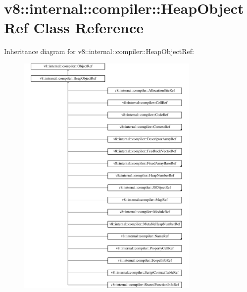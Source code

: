 \hypertarget{classv8_1_1internal_1_1compiler_1_1HeapObjectRef}{}\section{v8\+:\+:internal\+:\+:compiler\+:\+:Heap\+Object\+Ref Class Reference}
\label{classv8_1_1internal_1_1compiler_1_1HeapObjectRef}
Inheritance diagram for v8\+:\+:internal\+:\+:compiler\+:\+:Heap\+Object\+Ref\+:\begin{figure}[H]
\begin{center}
\leavevmode
\includegraphics[height=12.000000cm]{classv8_1_1internal_1_1compiler_1_1HeapObjectRef}
\end{center}
\end{figure}
